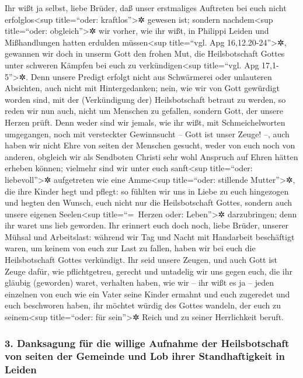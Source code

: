  Ihr wißt ja selbst, liebe Brüder, daß unser erstmaliges
Auftreten bei euch nicht erfolglos\textless sup title=``oder:
kraftlos''\textgreater✲ gewesen ist;  sondern
nachdem\textless sup title=``oder: obgleich''\textgreater✲ wir vorher,
wie ihr wißt, in Philippi Leiden und Mißhandlungen hatten erdulden
müssen\textless sup title=``vgl. Apg 16,12.20-24''\textgreater✲,
gewannen wir doch in unserm Gott den frohen Mut, die Heilsbotschaft
Gottes unter schweren Kämpfen bei euch zu verkündigen\textless sup
title=``vgl. Apg 17,1-5''\textgreater✲.  Denn unsere
Predigt erfolgt nicht aus Schwärmerei oder unlauteren Absichten, auch
nicht mit Hintergedanken;  nein, wie wir von Gott
gewürdigt worden sind, mit der (Verkündigung der) Heilsbotschaft betraut
zu werden, so reden wir nun auch, nicht um Menschen zu gefallen, sondern
Gott, der unsere Herzen prüft.  Denn weder sind wir
jemals, wie ihr wißt, mit Schmeichelworten umgegangen, noch mit
versteckter Gewinnsucht -- Gott ist unser Zeuge! --,  auch
haben wir nicht Ehre von seiten der Menschen gesucht, weder von euch
noch von anderen,  obgleich wir als Sendboten Christi sehr
wohl Anspruch auf Ehren hätten erheben können; vielmehr sind wir unter
euch sanft\textless sup title=``oder: liebevoll''\textgreater✲
aufgetreten wie eine Amme\textless sup title=``oder: stillende
Mutter''\textgreater✲, die ihre Kinder hegt und pflegt: 
so fühlten wir uns in Liebe zu euch hingezogen und hegten den Wunsch,
euch nicht nur die Heilsbotschaft Gottes, sondern auch unsere eigenen
Seelen\textless sup title=``=~Herzen oder: Leben''\textgreater✲
darzubringen; denn ihr waret uns lieb geworden.  Ihr
erinnert euch doch noch, liebe Brüder, unserer Mühsal und Arbeitslast:
während wir Tag und Nacht mit Handarbeit beschäftigt waren, um keinem
von euch zur Last zu fallen, haben wir bei euch die Heilsbotschaft
Gottes verkündigt.  Ihr seid unsere Zeugen, und auch Gott
ist Zeuge dafür, wie pflichtgetreu, gerecht und untadelig wir uns gegen
euch, die ihr gläubig (geworden) waret, verhalten haben, 
wie wir -- ihr wißt es ja -- jeden einzelnen von euch wie ein Vater
seine Kinder  ermahnt und euch zugeredet und euch
beschworen haben, ihr möchtet würdig des Gottes wandeln, der euch zu
seinem\textless sup title=``oder: für sein''\textgreater✲ Reich und zu
seiner Herrlichkeit beruft.

\hypertarget{danksagung-fuxfcr-die-willige-aufnahme-der-heilsbotschaft-von-seiten-der-gemeinde-und-lob-ihrer-standhaftigkeit-in-leiden}{%
\subsubsection{3. Danksagung für die willige Aufnahme der Heilsbotschaft
von seiten der Gemeinde und Lob ihrer Standhaftigkeit in
Leiden}\label{danksagung-fuxfcr-die-willige-aufnahme-der-heilsbotschaft-von-seiten-der-gemeinde-und-lob-ihrer-standhaftigkeit-in-leiden}}

